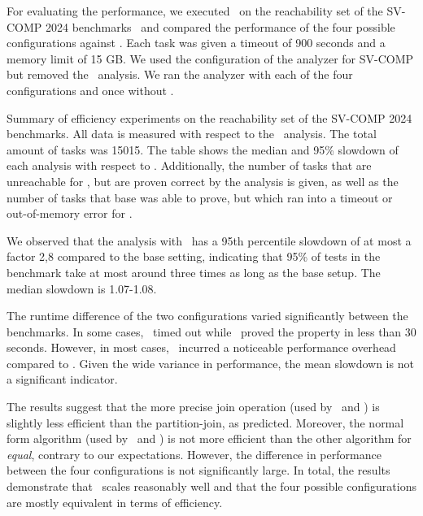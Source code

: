 For evaluating the performance, we executed \cpo\ on the reachability set
of the SV-COMP 2024 benchmarks~\cite{Beyer24} and compared the performance of the four possible configurations against \base.
Each task was given a timeout of 900 seconds and a memory limit of 15 GB.\@
We used the configuration of the analyzer for SV-COMP but removed the \vareq\ analysis.
We ran the analyzer with each of the four configurations and once without \cpo.

\begin{table}[t]
    \centering
    \caption[Results of experiments on SV-COMP.]{Summary of efficiency experiments on the reachability set
        of the SV-COMP 2024 benchmarks.
        All data is measured with respect to the \base\ analysis.
        The total amount of tasks was 15015.
        The table shows the median and 95\% slowdown of each analysis with respect to \base.
        Additionally, the number of tasks that are unreachable for \base, but are proven correct by the analysis is given, as well as the number of tasks that base was able to prove, but which ran into a timeout or out-of-memory error for \cpo.
        }\label{tab:summary-svcomp}
    
\end{table}

We observed that the analysis with \cpo\ has a 95th percentile slowdown of at most a factor 2,8 compared to the base setting,
indicating that 95\% of tests in the benchmark take at most around three times as long as the base setup.
The median slowdown is 1.07-1.08.

The runtime difference of the two configurations varied significantly between the benchmarks.
In some cases, \base\ timed out while \cpo\ proved the property in less than 30 seconds.
However, in most cases, \cpo\ incurred a noticeable performance overhead compared to \base.
Given the wide variance in performance, the mean slowdown is not a significant indicator.

The results suggest that the more precise join operation (used by \cpou\ and \cpot) is slightly less efficient than the partition-join, as predicted.
Moreover, the normal form algorithm (used by \cpou\ and \cpod) is not more efficient than the other algorithm for \emph{equal}, contrary to our expectations.
However, the difference in performance between the four configurations is not significantly large.
In total, the results demonstrate that \cpo\ scales reasonably well and that the four possible configurations are mostly equivalent in terms of efficiency.

